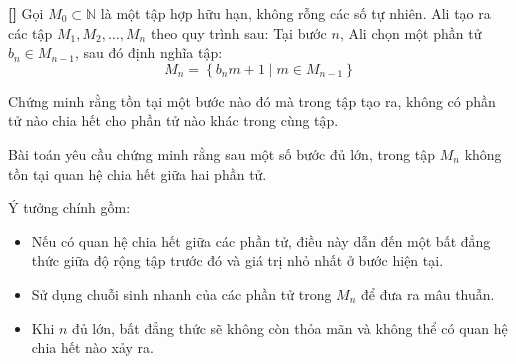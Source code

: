 \documentclass[../01-divisibility.tex]{subfiles}
\begin{document}
\begin{example*}\label{example:IRN-2015-N2}\textbf{[]}
	Gọi \( M_0 \subset \mathbb{N} \) là một tập hợp hữu hạn, không rỗng các số tự nhiên. Ali tạo ra các tập \( M_1, M_2, \dots, M_n \) theo quy trình sau:
	Tại bước \( n \), Ali chọn một phần tử \( b_n \in M_{n-1} \), sau đó định nghĩa tập:
	\[
		M_n = \left\{ b_n m + 1 \mid m \in M_{n-1} \right\}
	\]

	Chứng minh rằng tồn tại một bước nào đó mà trong tập tạo ra, không có phần tử nào chia hết cho phần tử nào khác trong cùng tập.
\end{example*}

\begin{story*}
	Bài toán yêu cầu chứng minh rằng sau một số bước đủ lớn, trong tập \( M_n \) không tồn tại quan hệ chia hết giữa hai phần tử.

	Ý tưởng chính gồm:
	\begin{itemize}[topsep=0pt, partopsep=0pt, itemsep=0pt]
		\item Nếu có quan hệ chia hết giữa các phần tử, điều này dẫn đến một bất đẳng thức giữa độ rộng tập trước đó và giá trị nhỏ nhất ở bước hiện tại.
		\item Sử dụng chuỗi sinh nhanh của các phần tử trong \( M_n \) để đưa ra mâu thuẫn.
		\item Khi \( n \) đủ lớn, bất đẳng thức sẽ không còn thỏa mãn và không thể có quan hệ chia hết nào xảy ra.
	\end{itemize}
\end{story*}

\bigbreak
\end{document}
